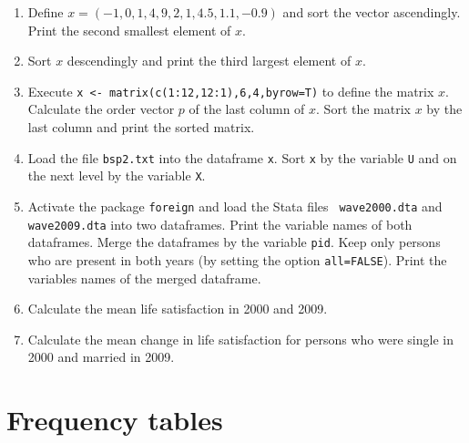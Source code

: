 \documentclass{article}
\begin{document}
\begin{enumerate}
\item Define $x=\left( -1,0,1,4,9,2,1,4.5,1.1,-0.9\right) $ and sort the
vector ascendingly. Print the second smallest element of $x$.

\item Sort $x$ descendingly and print the third largest element of $x.$

\item Execute \texttt{x <- matrix(c(1:12,12:1),6,4,byrow=T)} to
define the matrix $x.$ Calculate the order vector $p$ of the last column of $%
x.$ Sort the matrix $x$ by the last column and print the sorted matrix.

\item Load the file \texttt{bsp2.txt} into the dataframe \texttt{x}. Sort 
\texttt{x} by the variable \texttt{U} and on the next level by the variable 
\texttt{X}.

\item Activate the package \texttt{foreign} and load the Stata files \texttt{%
wave2000.dta} and \texttt{wave2009.dta} into two dataframes. Print the
variable names of both dataframes. Merge the dataframes by the variable 
\texttt{pid}. Keep only persons who are present in both years (by setting
the option \texttt{all=FALSE}). Print the variables names of the merged
dataframe.

\item Calculate the mean life satisfaction in 2000 and 2009.

\item Calculate the mean change in life satisfaction for persons who were
single in 2000 and married in 2009.
\end{enumerate}
\newpage


\section{Frequency tables}
\end{document}
